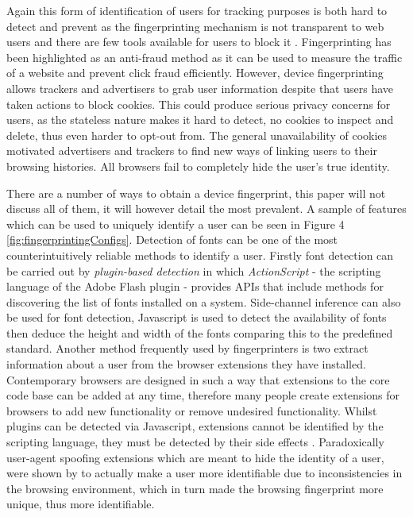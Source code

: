 \documentclass{article}
\begin{document}
Again this form of identification of users for tracking purposes is both hard to detect and prevent as the fingerprinting mechanism is not transparent to web users and there are few tools available for users to block it \parencite{uniqueBrowser}. Fingerprinting has been highlighted as an anti-fraud method as it can be used to measure the traffic of a website and prevent click fraud efficiently. However, device fingerprinting allows trackers and advertisers to grab user information despite that users have taken actions to block cookies. This could produce serious privacy concerns for users, as the stateless nature makes it hard to detect, no cookies to inspect and delete, thus even harder to opt-out from. The general unavailability of cookies motivated advertisers and trackers to find new ways of linking users to their browsing histories. All browsers fail to completely hide the user's true identity. 

There are a number of ways to obtain a device fingerprint, this paper will not discuss all of them, it will however detail the most prevalent. A sample of features which can be used to uniquely identify a user can be seen in Figure 4 \ref{fig:fingerprintingConfigs}. Detection of fonts can be one of the most counterintuitively reliable methods to identify a user. Firstly font detection can be carried out by \textit{plugin-based detection} in which \textit{ActionScript} - the scripting language of the Adobe Flash plugin - provides APIs that include methods for discovering the list of fonts installed on a system. Side-channel inference can also be used for font detection, Javascript is used to detect the availability of fonts then deduce the height and width of the fonts comparing this to the predefined standard. Another method frequently used by fingerprinters is two extract information about a user from the browser extensions they have installed. Contemporary browsers are designed in such a way that extensions to the core code base can be added at any time, therefore many people create extensions for browsers to add new functionality or remove undesired functionality. Whilst plugins can be detected via Javascript, extensions cannot be identified by the scripting language, they must be detected by their side effects \parencite{dustingFP}. Paradoxically user-agent spoofing extensions which are meant to hide the identity of a user, were shown by \parencite{cookielessMonster} to actually make a user more identifiable due to inconsistencies in the browsing environment, which in turn made the browsing fingerprint more unique, thus more identifiable. 
\end{document}
